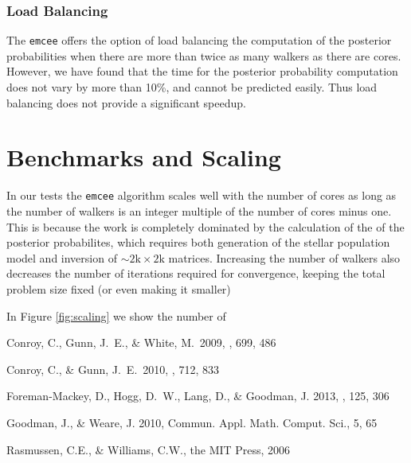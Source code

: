 \documentclass[11pt,preprint]{aastex}
\begin{document}
\subsubsection{Load Balancing}
The \texttt{emcee} offers the option of load balancing the computation of the posterior probabilities when there are more than twice as many walkers as there are cores.  However, we have found that the time for the posterior probability computation does not vary by more than 10\%, and cannot be predicted easily. Thus load balancing does not provide a significant speedup. 

\section{Benchmarks and Scaling}
In our tests the \texttt{emcee} algorithm scales well with the number of cores as long as the number of walkers is an integer multiple of the number of cores minus one.  This is because the work is completely dominated by the calculation of the of the posterior probabilites, which requires both generation of the stellar population model and inversion of $\sim 2\mbox{k} \times 2\mbox{k}$ matrices.  Increasing the number of walkers also decreases the number of iterations required for convergence, keeping the total problem size fixed (or even making it smaller)

In Figure \ref{fig:scaling} we show the number of 

\begin{thebibliography}

Conroy, C., Gunn, J.~E., \& White, M.\ 2009, \apj, 699, 486 

Conroy, C., \& Gunn, J.~E.\ 2010, \apj, 712, 833 

Foreman-Mackey, D., Hogg, D.~W., Lang, D., \& Goodman, J. 2013, \pasp, 125, 306 

Goodman, J., \& Weare,  J. 2010, Commun. Appl. Math. Comput. Sci., 5, 65

Rasmussen, C.E., \& Williams, C.W., the MIT Press, 2006

\end{thebibliography}
\end{document}
